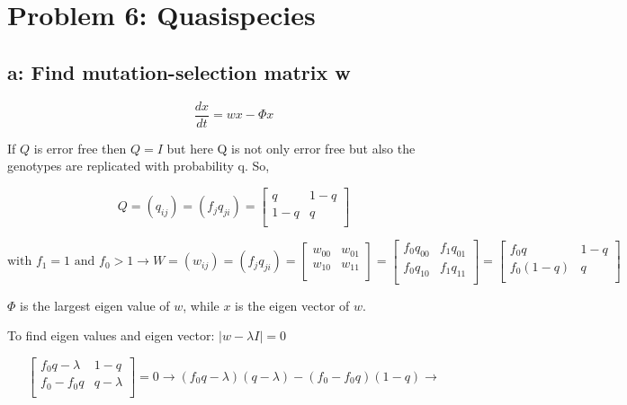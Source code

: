 \setcounter{chapter}{6}
\setcounter{section}{0}
\section{Problem 6: Quasispecies}
\subsection{a: Find mutation-selection matrix w}
\[ \frac{dx}{dt} = wx - \varPhi x \] 

If $Q$ is error free then $Q=I$ but here Q is not only error free but also the genotypes are replicated with probability q. So, 

\[ Q = (q_{ij}) = (f_{j}q_{ji}) = \begin{bmatrix}
       q & 1-q\\[0.3em]
       1-q & q \\[0.3em]
     \end{bmatrix} \]

\[ \text{with } f_1 = 1 \text{ and } f_0 > 1 \rightarrow W = (w_{ij}) = (f_jq_{ji}) = \begin{bmatrix}
       w_{00} & w_{01}\\[0.3em]
       w_{10} & w_{11} \\[0.3em]
     \end{bmatrix} = \begin{bmatrix}
            f_0q_{00} & f_1q_{01}\\[0.3em]
            f_0q_{10} & f_1q_{11} \\[0.3em]
          \end{bmatrix} = \begin{bmatrix}
                      f_0q & 1-q\\[0.3em]
                      f_0(1-q) & q \\[0.3em]
                    \end{bmatrix} \] 
 
$\varPhi$ is the largest eigen value of $w$, while $x$ is the eigen vector of $w$.

To find eigen values and eigen vector: $ |w - \lambda I | = 0 $ 

\[ \begin{bmatrix}
       f_0q-\lambda & 1-q\\[0.3em]
       f_0-f_0q & q-\lambda \\[0.3em]
     \end{bmatrix} = 0 \rightarrow (f_0q - \lambda)(q-\lambda)-(f_0-f_0q)(1-q)  \rightarrow \]
     

